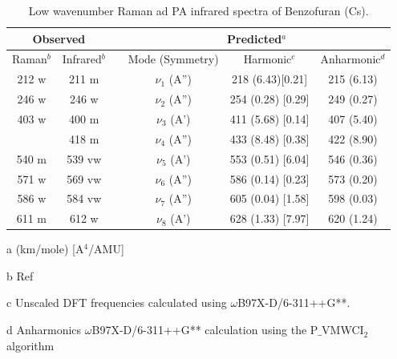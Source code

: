 	\begin{table}[H]
		\caption{Low wavenumber Raman ad PA infrared spectra of Benzofuran (Cs).}
		\begin{center}
			\begin{threeparttable}
				\begin{tabular}{c c c c c c}
					\hline
					\multicolumn{ 2}{c}{Observed} & \multicolumn{1}{c}{} & \multicolumn{ 3}{c}{Predicted$^{a}$} \\ \hline
					Raman$^{b}$ & \multicolumn{1}{c}{Infrared$^{b}$} &  & \multicolumn{1}{c}{Mode (Symmetry)} & \multicolumn{1}{c}{Harmonic$^{c}$} & Anharmonic$^{d}$ \\ \hline
	212 w & 211 m &  & $\nu_{1}$ (A”) & 218 (6.43)[0.21] & 215 (6.13) \\ 
	246 w & 246 w &  & $\nu_{2}$ (A”) & 254 (0.28) [0.29] & 249 (0.27) \\ 
	403 w & 400 m &  & $\nu_{3}$ (A’) & 411 (5.68) [0.14] & 407 (5.40) \\ 
	& 418 m &  & $\nu_{4}$ (A”)	& 433 (8.48) [0.38] & 422 (8.90)	\\ 
	540 m & 539 vw &  & $\nu_{5}$ (A’) & 553 (0.51) [6.04] & 546 (0.36) \\ 
	571 w & 569 vw &  & $\nu_{6}$ (A”) & 586 (0.14) [0.23] & 573 (0.20) \\ 
	586 w & 584 vw &  & $\nu_{7}$ (A”) & 605 (0.04) [1.58] & 598 (0.03) \\ 
	611 m & 612 w &  & $\nu_{8}$ (A’)& 628 (1.33) [7.97] & 620 (1.24)	\\
 \hline
	\end{tabular}
	
	\begin{tablenotes}
		\item[a] (km/mole) [A$^{4}$/AMU]
		\item[b] Ref \cite{singh2006ab}
		\item[c] Unscaled DFT frequencies calculated using $\omega$B97X-D/6-311++G**.
		\item[d] Anharmonics $\omega$B97X-D/6-311++G** calculation using the P$\_$VMWCI$_{2}$ algorithm
	\end{tablenotes}
\end{threeparttable}
\end{center}
\label{lowfreq-Benzofuran}
\end{table}


